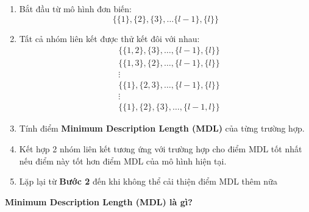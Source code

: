 \documentclass{book}
\begin{document}
            \begin{enumerate}
                \item Bắt đầu từ mô hình đơn biến:
                \[
                \{\{1\},\{2\},\{3\},…\{l-1\},\{l\}\}
                \]
                \item Tất cả nhóm liên kết được thử kết đôi với nhau:
                \begin{align*}
                    &\{\{1,2\},\{3\},\ldots,\{l{-}1\},\{l\}\} \\
                    &\{\{1,3\},\{2\},\ldots,\{l{-}1\},\{l\}\} \\
                    &\vdots \\
                    &\{\{1\},\{2,3\},\ldots,\{l{-}1\},\{l\}\} \\
                    &\vdots \\
                    &\{\{1\},\{2\},\{3\},\ldots,\{l{-}1,l\}\}
                \end{align*}
                \item Tính điểm \textbf{Minimum Description Length (MDL)} của từng trường hợp.
                \item Kết hợp 2 nhóm liên kết tương ứng với trường hợp cho điểm MDL tốt nhất nếu điểm này tốt hơn điểm MDL của mô hình hiện tại.
                \item Lặp lại từ \textbf{Bước 2} đến khi không thể cải thiện điểm MDL thêm nữa
            \end{enumerate}
            \textbf{Minimum Description Length (MDL) là gì?}
\end{document}
